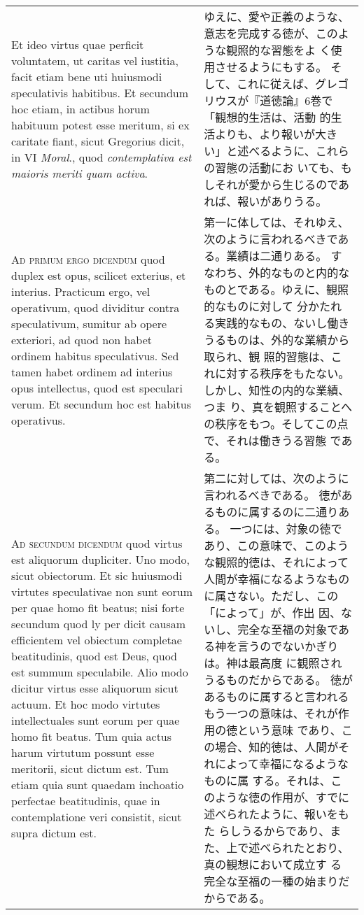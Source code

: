 \documentclass[10pt]{jsarticle} %
\begin{document}
\begin{longtable}{p{21em}p{21em}}
\\


Et ideo virtus quae perficit voluntatem, ut caritas
 vel iustitia, facit etiam bene uti huiusmodi speculativis habitibus. Et
 secundum hoc etiam, in actibus horum habituum potest esse meritum, si
 ex caritate fiant, sicut Gregorius dicit, in VI {\itshape Moral}., quod
 {\itshape contemplativa est maioris meriti quam activa}.


&

ゆえに、愛や正義のような、意志を完成する徳が、このような観照的な習態をよ
 く使用させるようにもする。
そして、これに従えば、グレゴリウスが『道徳論』6巻で「観想的生活は、活動
 的生活よりも、より報いが大きい」と述べるように、これらの習態の活動にお
 いても、もしそれが愛から生じるのであれば、報いがありうる。

\\


{\scshape Ad primum ergo dicendum} quod duplex est
 opus, scilicet exterius, et interius. Practicum ergo, vel operativum,
 quod dividitur contra speculativum, sumitur ab opere exteriori, ad quod
 non habet ordinem habitus speculativus. Sed tamen habet ordinem ad
 interius opus intellectus, quod est speculari verum. Et secundum hoc
 est habitus operativus.

&
第一に体しては、それゆえ、次のように言われるべきである。業績は二通りある。
 すなわち、外的なものと内的なものとである。ゆえに、観照的なものに対して
 分かたれる実践的なもの、ないし働きうるものは、外的な業績から取られ、観
 照的習態は、これに対する秩序をもたない。しかし、知性の内的な業績、つま
 り、真を観照することへの秩序をもつ。そしてこの点で、それは働きうる習態
 である。

\\


{\scshape Ad secundum dicendum} quod virtus est
 aliquorum dupliciter. Uno modo, sicut obiectorum. Et sic huiusmodi
 virtutes speculativae non sunt eorum per quae homo fit beatus; nisi
 forte secundum quod ly per dicit causam efficientem vel obiectum
 completae beatitudinis, quod est Deus, quod est summum
 speculabile. Alio modo dicitur virtus esse aliquorum sicut actuum. Et
 hoc modo virtutes intellectuales sunt eorum per quae homo fit
 beatus. Tum quia actus harum virtutum possunt esse meritorii, sicut
 dictum est. Tum etiam quia sunt quaedam inchoatio perfectae
 beatitudinis, quae in contemplatione veri consistit, sicut supra dictum
 est.

&

第二に対しては、次のように言われるべきである。
徳があるものに属するのに二通りある。
一つには、対象の徳であり、この意味で、このような観照的徳は、それによって
 人間が幸福になるようなものに属さない。ただし、この「によって」が、作出
 因、ないし、完全な至福の対象である神を言うのでないかぎりは。神は最高度
 に観照されうるものだからである。
徳があるものに属すると言われるもう一つの意味は、それが作用の徳という意味
 であり、この場合、知的徳は、人間がそれによって幸福になるようなものに属
 する。それは、このような徳の作用が、すでに述べられたように、報いをもた
 らしうるからであり、また、上で述べられたとおり、真の観想において成立す
 る完全な至福の一種の始まりだからである。


\end{longtable}
\end{document}
